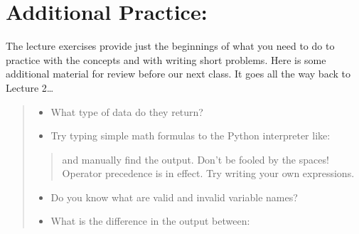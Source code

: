 \documentclass[letterpaper,10pt,english]{sphinxmanual}
\begin{document}
\section{Additional Practice:}
\label{\detokenize{lecture_notes/lec05_functions2:additional-practice}}
The lecture exercises provide just the beginnings of what you need to
do to practice with the concepts and with writing short problems.
Here is some additional material for review before our next class.  It
goes all the way back to Lecture 2…
\begin{quote}
\begin{itemize}
\item {} 
 What type of data do they return?

\item {} 
Try typing simple math formulas to the Python interpreter like:

%
\begin{sphinxVerbatim}[commandchars=\\\{\}]
             
\end{sphinxVerbatim}

\end{itemize}
\begin{quote}

and manually find the output. Don’t be fooled by the spaces!
Operator precedence is in effect. Try writing your own expressions.
\end{quote}
\begin{itemize}
\item {} 
 Do you know what are valid and invalid variable names?

\item {} 
What is the difference in the output between:

%
\begin{sphinxVerbatim}[commandchars=\\\{\}]
  
  
    
       
\end{sphinxVerbatim}


\end{itemize}
\end{quote}
\end{document}
